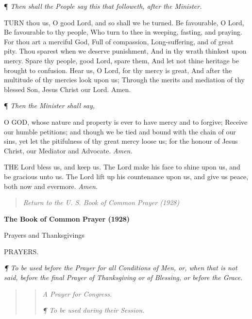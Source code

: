 ¶ \emph{Then shall the
People say this that followeth, after the Minister.}

TURN thou us, O good Lord,
and so shall we be turned. Be favourable, O Lord, Be favourable to thy
people, Who turn to thee in weeping, fasting, and praying. For thou art
a merciful God, Full of compassion, Long-suffering, and of great pity.
Thou sparest when we deserve punishment, And in thy wrath thinkest upon
mercy. Spare thy people, good Lord, spare them, And let not thine heritage
be brought to confusion. Hear us, O Lord, for thy mercy is great, And
after the multitude of thy mercies look upon us; Through the merits and
mediation of thy blessed Son, Jesus Christ our Lord. Amen.

¶ \emph{Then the Minister shall say,}

O GOD, whose nature and
property is ever to have mercy and to forgive; Receive our humble petitions;
and though we be tied and bound with the chain of our sins, yet let the
pitifulness of thy great mercy loose us; for the honour of Jesus Christ,
our Mediator and Advocate. \emph{Amen.}

THE Lord bless us, and
keep us. The Lord make his face to shine upon us, and be gracious unto
us. The Lord lift up his countenance upon us, and give us peace, both
now and evermore. \emph{Amen.}

\begin{quote}

\emph{Return to the U.
S. Book of Common Prayer (1928)}

\end{quote}


\textbf{The Book of Common Prayer (1928)}

Prayers
and Thanksgivings

PRAYERS.

\emph{¶
To be used before the Prayer for all Conditions of Men, or, when that
is not said, before the final Prayer of Thanksgiving or of Blessing, or
before the Grace.}

\begin{quote}

\begin{quote}

\emph{A
Prayer for Congress.}

\emph{¶
To be used during their Session.}

\end{quote}

\end{quote}

